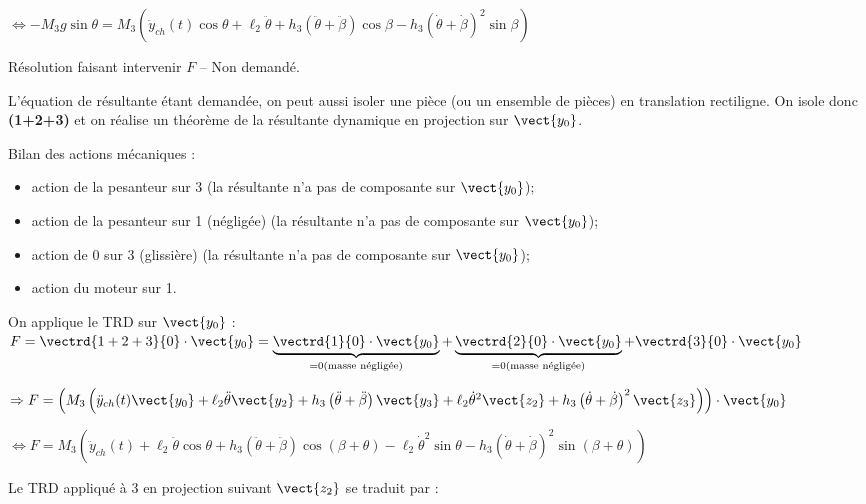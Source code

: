 \begin{multicols}{2}
\begin{corrige}
$ \Leftrightarrow -M_3 g \sin \theta  = 
 M_3\left(\ddot{y}_{ch}(t) \cos \theta +\ell_2\ddot{\theta} +h_3\left(\ddot{\theta}+\ddot{\beta}\right)\cos \beta 
-h_3\left(\dot{\theta}+\dot{\beta}\right)^2\sin\beta \right)$


\vspace{.6cm}
Résolution faisant intervenir $F$ -- Non demandé.

L'équation de résultante étant demandée, on peut aussi isoler une pièce (ou un ensemble de pièces) en translation rectiligne. On isole donc \textbf{(1+2+3)} et on réalise un théorème de la résultante dynamique en projection sur $\vect{y_0}$. 

Bilan des actions mécaniques : 
\begin{itemize}
\item action de la pesanteur sur 3 (la résultante n'a pas de composante sur $\vect{y_0}$);
\item action de la pesanteur sur 1 (négligée) (la résultante n'a pas de composante sur $\vect{y_0}$);
\item action de 0 sur 3 (glissière) (la résultante n'a pas de composante sur $\vect{y_0}$);
\item action du moteur sur 1.
\end{itemize}

On applique le TRD sur $\vect{y_0}$ :
$F = \vectrd{1+2+3}{0}\cdot \vect{y_0}= \underbrace{\vectrd{1}{0} \cdot  \vect{y_0}}_{=0 \text{(masse négligée)}}+ \underbrace{\vectrd{2}{0}\cdot  \vect{y_0}}_{=0 \text{(masse négligée)}} + \vectrd{3}{0}\cdot \vect{y_0}$

 $ \Rightarrow F = \left( M_3\left(\ddot{y}_{ch}(t) \vect{y_0}+\ell_2\ddot{\theta} \vect{y_2}+h_3\left(\ddot{\theta}+\ddot{\beta}\right) \vect{y_3}
+   
\ell_2\dot{\theta}^2 \vect{z_2}  +h_3\left(\dot{\theta}+\dot{\beta}\right)^2\vect{z_3}\right)\right) \cdot \vect{y_0}$

 $ \Leftrightarrow F =  M_3\left(\ddot{y}_{ch}(t) +\ell_2\ddot{\theta} \cos \theta +h_3\left(\ddot{\theta}+\ddot{\beta}\right) \cos \left( \beta+\theta\right)
-
\ell_2\dot{\theta}^2 \sin \theta   -h_3\left(\dot{\theta}+\dot{\beta}\right)^2  \sin \left( \beta+\theta\right)\right) $
\end{corrige}
\else
\fi

\ifprof
\begin{corrige}
Le TRD appliqué à 3 en projection suivant $\vect{z_2}$ se traduit par : 


\end{corrige}
\end{multicols}
